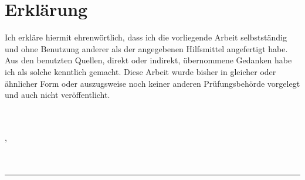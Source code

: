 
\section*{Erklärung}
%

\vspace*{2em}

Ich erkläre hiermit ehrenwörtlich, dass ich die vorliegende Arbeit selbstständig und ohne Benutzung anderer als der angegebenen Hilfsmittel angefertigt habe. Aus den benutzten Quellen, direkt oder indirekt, übernommene Gedanken habe ich als solche kenntlich gemacht.
Diese Arbeit wurde bisher in gleicher oder ähnlicher Form oder auszugsweise noch keiner anderen Prüfungsbehörde vorgelegt und auch nicht veröffentlicht.

~\\
~\\
\abgabeort, \datum
~\\
~\\
~\\
\rule{6cm}{0.4pt}\\
\autor
